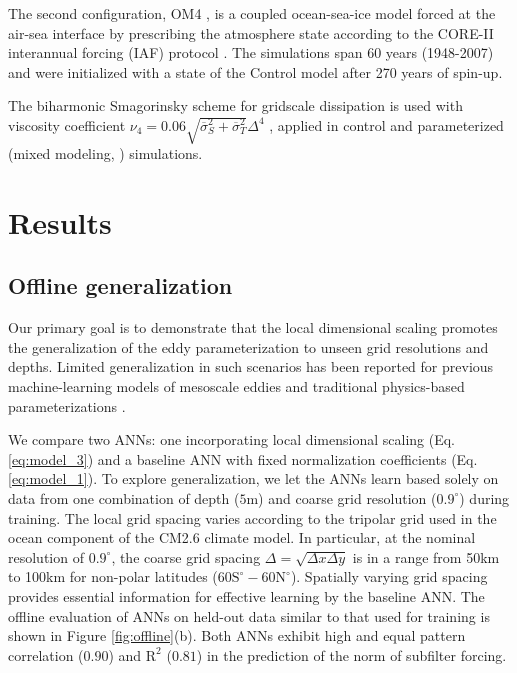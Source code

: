 \documentclass[draft]{agujournal2019}
\begin{document}
The second configuration, OM4 \cite{adcroft2019gfdl}, is a coupled ocean-sea-ice model forced at the air-sea interface by prescribing the atmosphere state according to the CORE-II interannual forcing (IAF) protocol \cite{large2009global}. The simulations span 60 years (1948-2007) and were initialized with a state of the Control model after 270 years of spin-up.

The biharmonic Smagorinsky scheme for gridscale dissipation is used with viscosity coefficient $\nu_4 = 0.06 \sqrt{\overline{\sigma}_S^2+\overline{\sigma}_T^2} \Delta^4$   \cite{adcroft2019gfdl}, applied in control and parameterized (mixed modeling, ) simulations. 




\section{Results}

\subsection{Offline generalization}
Our primary goal is to demonstrate that the local dimensional scaling promotes the generalization of the eddy parameterization to unseen grid resolutions and depths. Limited generalization in such scenarios has been reported for previous machine-learning models of mesoscale eddies \cite{zhang2023implementation, gultekin2024analysis,ross2022benchmarking} and traditional physics-based parameterizations \cite{yankovsky2024}. 

We compare two ANNs: one incorporating local dimensional scaling (Eq. \eqref{eq:model_3}) and a baseline ANN with fixed normalization coefficients (Eq. \eqref{eq:model_1}). To explore generalization, we let the ANNs learn based solely on data from one combination of depth ($5$m) and coarse grid resolution ($0.9^\circ$) during training. The local grid spacing varies according to the tripolar grid used in the ocean component of the CM2.6 climate model. In particular, at the nominal resolution of $0.9^\circ$, the coarse grid spacing $\Delta=\sqrt{\Delta x \Delta y}$ is in a range from 50km to 100km for non-polar latitudes ($60\mathrm{S}^\circ-60\mathrm{N}^\circ$). Spatially varying grid spacing provides essential information for effective learning by the baseline ANN. The offline evaluation of ANNs on held-out data similar to that used for training is shown in Figure \ref{fig:offline}(b). Both ANNs exhibit high and equal pattern correlation ($0.90$) and $\mathrm{R}^2$ ($0.81$) in the prediction of the norm of subfilter forcing. %
\end{document}
